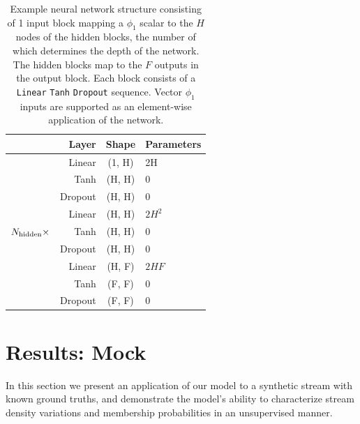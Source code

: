 \documentclass[twocolumn]{aastex631}
\begin{document}
        \begin{table}
            \centering
            \caption{%
            Example neural network structure consisting of 1 input block mapping
            a $\phi_1$ scalar to the $H$ nodes of the hidden blocks, the number
            of which determines the depth of the network. The hidden blocks map
            to the $F$ outputs in the output block. Each block consists of a
            \texttt{Linear} \!\!\textrightarrow \texttt{Tanh}
            \!\!\textrightarrow \texttt{Dropout} sequence. Vector $\phi_1$
            inputs are supported as an element-wise application of the network.
            }
            \label{table:mlp_structure}
            \begin{tabular}{@{}rrcl@{}}
            \toprule
            & Layer & Shape & Parameters \\
            \midrule
            & Linear & (1, H) & 2H  \\
            & Tanh & (H, H) & 0  \\
            & Dropout & (H, H) & 0  \\
            \hline
            & Linear & (H, H) & $2H^2$  \\
            $N_{\rm hidden} \times$ & Tanh & (H, H) & 0  \\
            & Dropout & (H, H) & 0  \\
            \hline
            & Linear & (H, F) & $2HF$  \\
            & Tanh & (F, F) & 0 \\
            & Dropout & (F, F) & 0  \\
            \bottomrule
            \end{tabular}
        \end{table}

        

\section{Results: Mock} \label{sec:results_mock}

    In this section we present an application of our model to a synthetic stream
    with known ground truths, and demonstrate the model's ability to
    characterize stream density variations and membership probabilities in an
    unsupervised manner.
\end{document}
